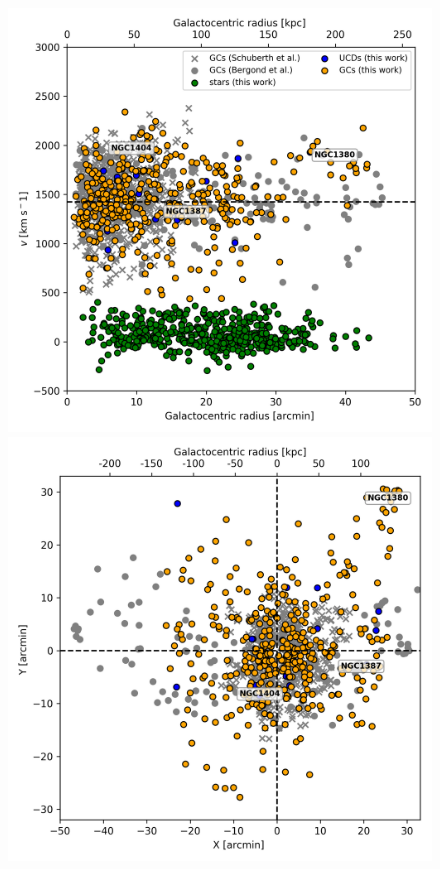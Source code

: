 \documentclass[useAMS,usenatbib]{mn2e}
\begin{document}
\begin{figure}
\centering
\includegraphics[width=\columnwidth]{figures/RV.png} 
\includegraphics[width=\columnwidth]{figures/XY.png} 

\end{figure}
\end{document}
